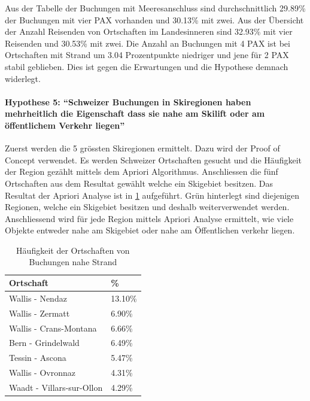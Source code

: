 Aus der Tabelle der Buchungen mit Meeresanschluss sind durchschnittlich \colorbox{green!25}{29.89\%} der Buchungen mit vier PAX vorhanden und \colorbox{red!25}{30.13\%} mit zwei. Aus der Übersicht der Anzahl Reisenden von Ortschaften im Landesinneren sind \colorbox{green!25}{32.93\%} mit vier Reisenden und \colorbox{red!25}{30.53\%} mit zwei. Die Anzahl an Buchungen mit 4 PAX ist bei Ortschaften mit Strand um 3.04 Prozentpunkte niedriger und jene für 2 PAX stabil geblieben. Dies ist gegen die Erwartungen und die Hypothese demnach widerlegt.

\paragraph{Hypothese 5: "`Schweizer Buchungen in Skiregionen haben mehrheitlich die Eigenschaft dass sie nahe am Skilift oder am öffentlichem Verkehr liegen"'} Zuerst werden die 5 grössten Skiregionen ermittelt. Dazu wird der Proof of Concept verwendet. Es werden Schweizer Ortschaften gesucht und die Häufigkeit der Region gezählt mittels dem Apriori Algorithmus. Anschliessen die fünf Ortschaften aus dem Resultat gewählt welche ein Skigebiet besitzen. Das Resultat der Apriori Analyse ist in \cref{sec:testingfazit:testing:hypothesen:4} aufgeführt. \colorbox{green!25}{Grün} hinterlegt sind diejenigen Regionen, welche ein Skigebiet besitzen und deshalb weiterverwendet werden. Anschliessend wird für jede Region mittels Apriori Analyse ermittelt, wie viele Objekte entweder nahe am Skigebiet oder nahe am Öffentlichen verkehr liegen.

\begin{table}[H] 
	\caption{Häufigkeit der Ortschaften von Buchungen nahe Strand}
	\centering
	\label{sec:testingfazit:testing:hypothesen:4}
	\begin{tabular}{ | l | l | } 
		\hline 
		\rowcolor{tableheadcolor}
		\bfseries Ortschaft & \bfseries \% \\ \hline 
		\cellcolor{green!25}Wallis - Nendaz & \cellcolor{green!25}13.10\% \\ \hline 
		\cellcolor{green!25}Wallis - Zermatt & \cellcolor{green!25}6.90\% \\ \hline 
		\cellcolor{green!25}Wallis - Crans-Montana & \cellcolor{green!25}6.66\% \\ \hline 
		\cellcolor{green!25}Bern - Grindelwald & \cellcolor{green!25}6.49\% \\ \hline 
		Tessin - Ascona & 5.47\% \\ \hline 
		Wallis - Ovronnaz & 4.31\% \\ \hline 
		\cellcolor{green!25}Waadt - Villars-sur-Ollon & \cellcolor{green!25}4.29\% \\ \hline
	\end{tabular}
\end{table}

